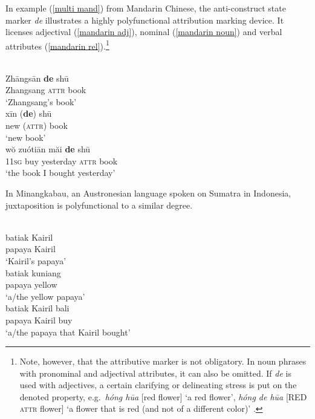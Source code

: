 In example (\ref{multi mand}) from Mandarin Chinese, the anti-construct state marker \textit{de} illustrates a highly polyfunctional attribution marking device. It licenses adjectival (\ref{mandarin adj}), nominal (\ref{mandarin noun}) and verbal attributes (\ref{mandarin rel}).\footnote{Note, however, that the attributive marker is not obligatory. In noun phrases with pronominal and adjectival attributes, it can also be omitted. If \textit{de} is used with adjectives, a certain clarifying or delineating stress is put on the denoted property, e.g.~\textit{hóng hūa} [red flower] ‘a red flower’, \textit{hóng de hūa} [RED \textsc{attr} flower] ‘a flower that is red (and not of a different color)’ \citep[119–123]{li-etal1981}.}
\begin{exe}
\ex
{} \label{multi mand}
\begin{xlist}
\\
\gll	Zhāngsān 	\textbf{de} 	shū\\
	Zhangsang 	{\textsc{attr}} 	book\\
\glt	‘Zhangsang's book’\label{mandarin noun}
\\
\gll	xīn 		(\textbf{de}) 	shū\\
	new	 	({\textsc{attr}}) 	book\\
\glt	‘new book’\label{mandarin adj}
\\
\gll	wŏ zuótiān 	măi 	\textbf{de} 	shū\\
	1\textsc{1sg} 	buy	yesterday 	{\textsc{attr}} 	book\\
\glt	‘the book I bought yesterday’\label{mandarin rel}
\end{xlist}
\end{exe}
In Minangkabau, an Austronesian language spoken on Sumatra in Indonesia, juxtaposition is polyfunctional to a similar degree.
\begin{exe}
\ex 
{} \label{multi minangkabau}
\begin{xlist}
\\
\gll	batiak Kairil\\
	papaya Kairil\\
\glt	‘Kairil's papaya’
\\
\gll	batiak kuniang\\
	papaya yellow\\
\glt	‘a/the yellow papaya’
\\
\gll	batiak Kairil bali\\
	papaya Kairil buy\\
\glt	‘a/the papaya that Kairil bought’
\end{xlist}
\end{exe}
